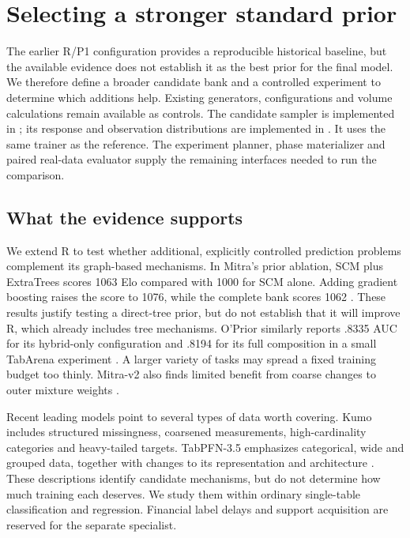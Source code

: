 \documentclass[11pt]{article}
\begin{document}
\section{Selecting a stronger standard prior}
\label{sec:prior-selection}

The earlier R/P1 configuration provides a reproducible historical baseline, but the available evidence does not establish it as the best prior for the final model. We therefore define a broader candidate bank and a controlled experiment to determine which additions help. Existing generators, configurations and volume calculations remain available as controls. The candidate sampler is implemented in ; its response and observation distributions are implemented in . It uses the same trainer as the reference. The experiment planner, phase materializer and paired real-data evaluator supply the remaining interfaces needed to run the comparison.

\subsection{What the evidence supports}

We extend R to test whether additional, explicitly controlled prediction problems complement its graph-based mechanisms. In Mitra's prior ablation, SCM plus ExtraTrees scores 1063 Elo compared with 1000 for SCM alone. Adding gradient boosting raises the score to 1076, while the complete bank scores 1062 \cite{mitra}. These results justify testing a direct-tree prior, but do not establish that it will improve R, which already includes tree mechanisms. O'Prior similarly reports .8335 AUC for its hybrid-only configuration and .8194 for its full composition in a small TabArena experiment \cite{oprior}. A larger variety of tasks may spread a fixed training budget too thinly. Mitra-v2 also finds limited benefit from coarse changes to outer mixture weights \cite{mitra2}.

Recent leading models point to several types of data worth covering. Kumo includes structured missingness, coarsened measurements, high-cardinality categories and heavy-tailed targets. TabPFN-3.5 emphasizes categorical, wide and grouped data, together with changes to its representation and architecture \cite{kumo,tabpfn35}. These descriptions identify candidate mechanisms, but do not determine how much training each deserves. We study them within ordinary single-table classification and regression. Financial label delays and support acquisition are reserved for the separate specialist.
\end{document}
